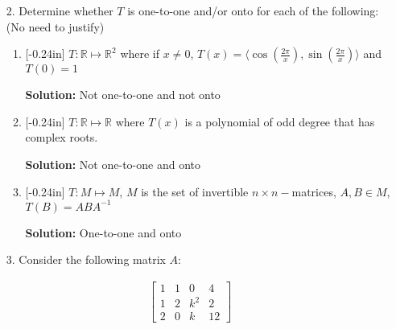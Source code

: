 \documentclass[letterpaper,12pt]{article}
\theoremstyle{definition}
\begin{document}
\pagebreak
\begin{enumerate}
    \item[2.]  Determine whether $T$ is one-to-one and/or onto for each of the following: (No need to justify) \begin{enumerate}
        \item\reversemarginpar{}[-0.24in] $T: \mathbb{R} \mapsto \mathbb{R}^2$ where if $x \neq 0$, $T(x)= \langle\cos\left (\frac{2\pi}{x} \right) ,\sin \left (\frac{2\pi}{x} \right)\rangle$ and $T(0) = 1$
        \begin{mdframed}
            \textbf{Solution:}
            Not one-to-one and not onto
        \end{mdframed}
        \vspace{1.9in}
        \item\reversemarginpar{}[-0.24in] $T:\mathbb{R} \mapsto \mathbb{R}$ where $T(x)$ is a polynomial of odd degree that has complex roots.
        \begin{mdframed}
            \textbf{Solution:}
            Not one-to-one and onto
        \end{mdframed}
        \vspace{1.9in}
        \item\reversemarginpar{}[-0.24in] $T: M \mapsto M$, $M$ is the set of invertible $n\times n-$matrices, $A,B \in M$, $T(B) = ABA^{-1}$
        \begin{mdframed}
            \textbf{Solution:}
            One-to-one and onto
        \end{mdframed}
    \end{enumerate}
\end{enumerate}
\pagebreak
\renewcommand{\arraystretch}{1}
\begin{enumerate}
    \item[3.] Consider the following matrix $A$: \end{enumerate} \begin{align*}
        \begin{bmatrix}
        1 & 1 & 0 & 4 \\
        1 & 2 & k^2 & 2\\
        2 & 0 & k & 12
    \end{bmatrix}
    \end{align*}
\end{document}

